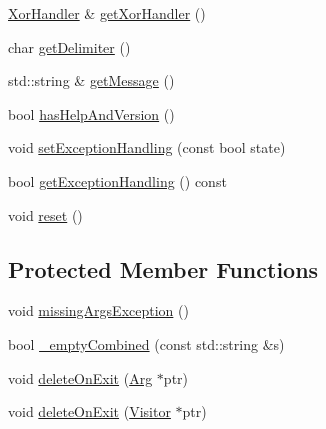 \begin{DoxyCompactItemize}
\item 
\hyperlink{class_t_c_l_a_p_1_1_xor_handler}{Xor\+Handler} \& \hyperlink{class_t_c_l_a_p_1_1_cmd_line_a805433b7718d1bc5bc9317bbd061449b}{get\+Xor\+Handler} ()
\item 
char \hyperlink{class_t_c_l_a_p_1_1_cmd_line_a3e9f0ac2c1e97d1f8527da713ddd5a8f}{get\+Delimiter} ()
\item 
std\+::string \& \hyperlink{class_t_c_l_a_p_1_1_cmd_line_a8f61a8c201e31ada985fa998180fd40f}{get\+Message} ()
\item 
bool \hyperlink{class_t_c_l_a_p_1_1_cmd_line_a5b23895feae4f4110b77dae372226475}{has\+Help\+And\+Version} ()
\item 
void \hyperlink{class_t_c_l_a_p_1_1_cmd_line_aa02055d8f4864bfa9b505e2d26bbbd87}{set\+Exception\+Handling} (const bool state)
\item 
bool \hyperlink{class_t_c_l_a_p_1_1_cmd_line_af2cd748a91e22df97c878d7eff8c4ca3}{get\+Exception\+Handling} () const 
\item 
void \hyperlink{class_t_c_l_a_p_1_1_cmd_line_a1721ec47c9d9f5ea2eca2f385fcfd2da}{reset} ()
\end{DoxyCompactItemize}
\subsection*{Protected Member Functions}
\begin{DoxyCompactItemize}
\item 
void \hyperlink{class_t_c_l_a_p_1_1_cmd_line_a698f47333350312eb949aa1ae4f89ad1}{missing\+Args\+Exception} ()
\item 
bool \hyperlink{class_t_c_l_a_p_1_1_cmd_line_a170a4e711c2a6d58a05e9ad3bc03c08a}{\+\_\+empty\+Combined} (const std\+::string \&s)
\item 
void \hyperlink{class_t_c_l_a_p_1_1_cmd_line_a42d669ed2037ac24fc78883aa8600655}{delete\+On\+Exit} (\hyperlink{class_t_c_l_a_p_1_1_arg}{Arg} $\ast$ptr)
\item 
void \hyperlink{class_t_c_l_a_p_1_1_cmd_line_a262b8d929eb5b0dfbfc17637c1325c36}{delete\+On\+Exit} (\hyperlink{class_t_c_l_a_p_1_1_visitor}{Visitor} $\ast$ptr)
\end{DoxyCompactItemize}
